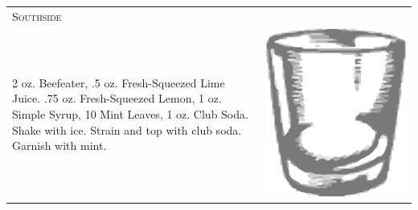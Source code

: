 \documentclass{article}
\begin{document}
\begin{tabular}{p{2in} p{0.5in}}
 \multicolumn{2}{p{3in}}{\centering\Huge\textsc{Southside}} \\ 
   \vspace{-0.1in}2 oz. Beefeater, .5 oz. Fresh-Squeezed Lime Juice. .75 oz. Fresh-Squeezed Lemon, 1 oz. Simple Syrup, 10 Mint Leaves, 1 oz. Club Soda. Shake with ice. Strain and top with club soda. Garnish with mint. &
   \vspace{-0.1in} \includegraphics{rocks_glass.png}
\end{tabular}
\end{document}
